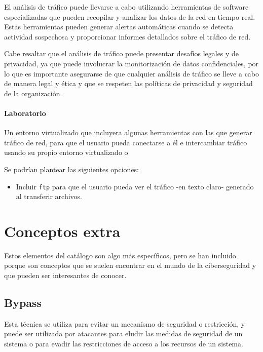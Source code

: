         El análisis de tráfico puede llevarse a cabo utilizando herramientas de software especializadas que pueden recopilar y analizar los datos de la red en tiempo real. Estas herramientas pueden generar alertas automáticas cuando se detecta actividad sospechosa y proporcionar informes detallados sobre el tráfico de red.
        
        Cabe resaltar que el análisis de tráfico puede presentar desafíos legales y de privacidad, ya que puede involucrar la monitorización de datos confidenciales, por lo que es importante asegurarse de que cualquier análisis de tráfico se lleve a cabo de manera legal y ética y que se respeten las políticas de privacidad y seguridad de la organización.

        \paragraph{Laboratorio}

            Un entorno virtualizado que incluyera algunas herramientas con las que generar tráfico de red, para que el usuario pueda conectarse a él e intercambiar tráfico usando su propio entorno virtualizado o

            Se podrían plantear las siguientes opciones:

            \begin{itemize}
                \item Incluir \texttt{ftp} para que el usuario pueda ver el tráfico -en texto claro- generado al transferir archivos.
            \end{itemize}


    \section{Conceptos extra}

        Estos elementos del catálogo son algo más específicos, pero se han incluido porque son conceptos que se suelen encontrar en el mundo de la ciberseguridad y que pueden ser interesantes de conocer.

        \subsection{Bypass}

            Esta técnica se utiliza para evitar un mecanismo de seguridad o restricción, y puede ser utilizada por atacantes para eludir las medidas de seguridad de un sistema o para evadir las restricciones de acceso a los recursos de un sistema.

